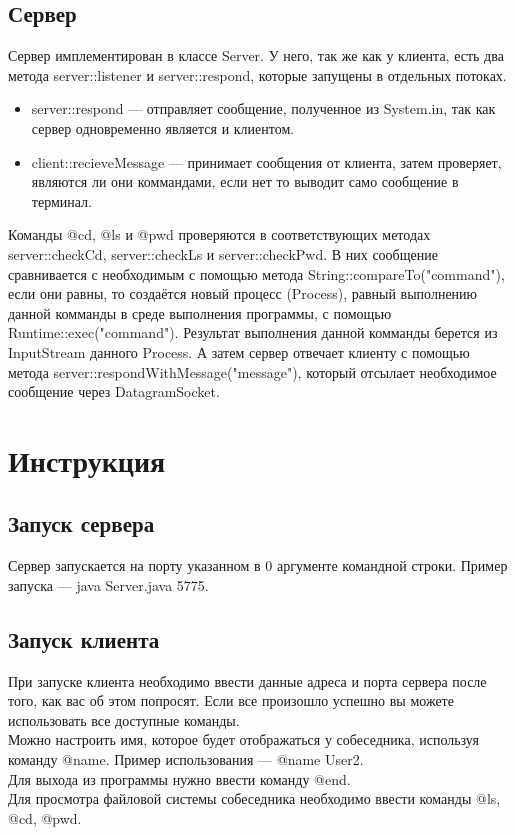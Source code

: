 \documentclass{article}
\begin{document}
\subsection{Сервер}
Сервер имплементирован в классе Server. У него, так же как у клиента, есть два метода server::listener и server::respond, которые запущены в отдельных потоках. 
\begin{itemize}
\item server::respond --- отправляет сообщение, полученное из System.in, так как сервер одновременно является и клиентом.
\item client::recieveMessage --- принимает сообщения от клиента, затем проверяет, являются ли они коммандами, если нет то выводит само сообщение в терминал. 
\end{itemize}
Команды @cd, @ls и @pwd проверяются в соответствующих методах server::checkCd, server::checkLs и server::checkPwd. В них сообщение сравнивается с необходимым с помощью метода String::compareTo("command"), если они равны, то создаётся новый процесс (Process), равный выполнению данной комманды в среде выполнения программы, с помощью Runtime::exec("command"). Результат выполнения данной комманды берется из InputStream данного Process. А затем сервер отвечает клиенту с помощью метода server::respondWithMessage("message"), который отсылает необходимое сообщение через DatagramSocket.
\section{Инструкция}

\subsection{Запуск сервера}
Сервер запускается на порту указанном в 0 аргументе командной строки. Пример запуска --- java Server.java 5775.

\subsection{Запуск клиента}
При запуске клиента необходимо ввести данные адреса и порта сервера после того, как вас об этом попросят. Если все произошло успешно вы можете использовать все доступные команды. 
\\
Можно настроить имя, которое будет отображаться у собеседника, используя команду @name. Пример использования --- @name User2.
\\
Для выхода из программы нужно ввести команду @end.
\\
Для просмотра файловой системы собеседника необходимо ввести команды @ls, @cd, @pwd. 
\end{document}
